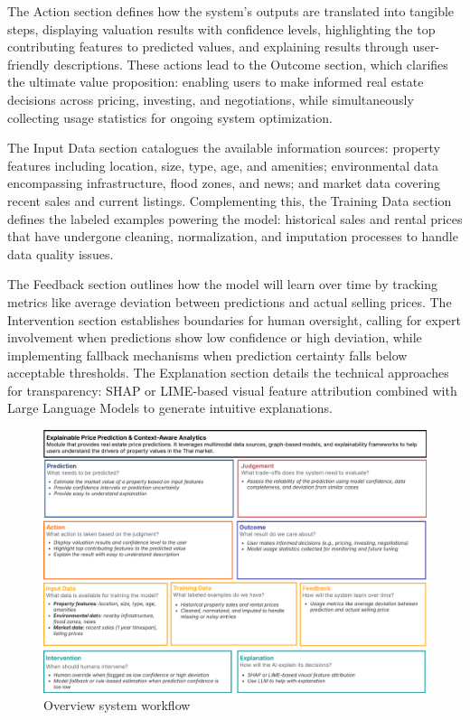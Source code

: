 The Action section defines how the system's outputs are translated into tangible steps, displaying valuation results with confidence levels, highlighting the top contributing features to predicted values, and explaining results through user-friendly descriptions. These actions lead to the Outcome section, which clarifies the ultimate value proposition: enabling users to make informed real estate decisions across pricing, investing, and negotiations, while simultaneously collecting usage statistics for ongoing system optimization.

The Input Data section catalogues the available information sources: property features including location, size, type, age, and amenities; environmental data encompassing infrastructure, flood zones, and news; and market data covering recent sales and current listings. Complementing this, the Training Data section defines the labeled examples powering the model: historical sales and rental prices that have undergone cleaning, normalization, and imputation processes to handle data quality issues.

The Feedback section outlines how the model will learn over time by tracking metrics like average deviation between predictions and actual selling prices. The Intervention section establishes boundaries for human oversight, calling for expert involvement when predictions show low confidence or high deviation, while implementing fallback mechanisms when prediction certainty falls below acceptable thresholds. The Explanation section details the technical approaches for transparency: SHAP or LIME-based visual feature attribution combined with Large Language Models to generate intuitive explanations.

\newpage

\begin{figure}[htbp]
	\centering
	\includegraphics[width=1\textwidth]{assets/ai/ai-canvas.png}
	\caption{Overview system workflow}
	\label{fig:ai-canvas}
\end{figure}


